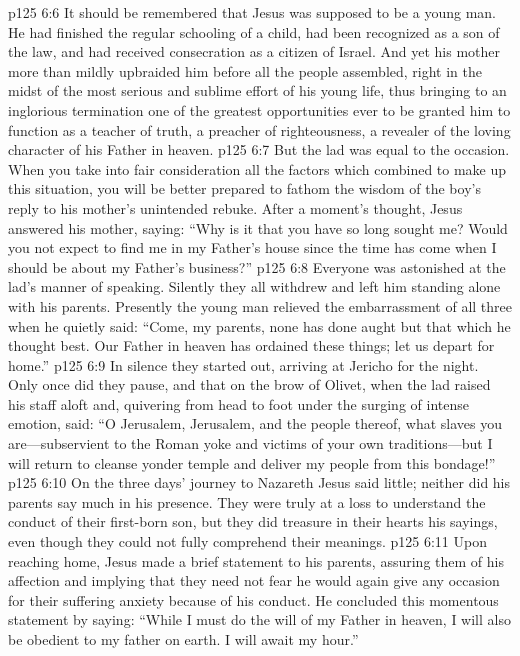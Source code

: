 \pc \vs p125 6:6 It should be remembered that Jesus was supposed to be a young man. He had finished the regular schooling of a child, had been recognized as a son of the law, and had received consecration as a citizen of Israel. And yet his mother more than mildly upbraided him before all the people assembled, right in the midst of the most serious and sublime effort of his young life, thus bringing to an inglorious termination one of the greatest opportunities ever to be granted him to function as a teacher of truth, a preacher of righteousness, a revealer of the loving character of his Father in heaven.
\vs p125 6:7 But the lad was equal to the occasion. When you take into fair consideration all the factors which combined to make up this situation, you will be better prepared to fathom the wisdom of the boy’s reply to his mother’s unintended rebuke. After a moment’s thought, Jesus answered his mother, saying: \textcolor{ubdarkred}{“Why is it that you have so long sought me? Would you not expect to find me in my Father’s house since the time has come when I should be about my Father’s business?”}
\vs p125 6:8 Everyone was astonished at the lad’s manner of speaking. Silently they all withdrew and left him standing alone with his parents. Presently the young man relieved the embarrassment of all three when he quietly said: \textcolor{ubdarkred}{“Come, my parents, none has done aught but that which he thought best. Our Father in heaven has ordained these things; let us depart for home.”}
\vs p125 6:9 In silence they started out, arriving at Jericho for the night. Only once did they pause, and that on the brow of Olivet, when the lad raised his staff aloft and, quivering from head to foot under the surging of intense emotion, said: \textcolor{ubdarkred}{“O Jerusalem, Jerusalem, and the people thereof, what slaves you are---subservient to the Roman yoke and victims of your own traditions---but I will return to cleanse yonder temple and deliver my people from this bondage!”}
\vs p125 6:10 On the three days’ journey to Nazareth Jesus said little; neither did his parents say much in his presence. They were truly at a loss to understand the conduct of their first\hyp{}born son, but they did treasure in their hearts his sayings, even though they could not fully comprehend their meanings.
\vs p125 6:11 Upon reaching home, Jesus made a brief statement to his parents, assuring them of his affection and implying that they need not fear he would again give any occasion for their suffering anxiety because of his conduct. He concluded this momentous statement by saying: \textcolor{ubdarkred}{“While I must do the will of my Father in heaven, I will also be obedient to my father on earth. I will await my hour.”}
